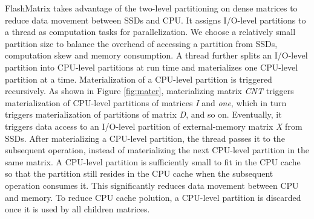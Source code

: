 FlashMatrix takes advantage of the two-level partitioning on dense matrices
to reduce data movement between SSDs and CPU. It assigns I/O-level partitions
to a thread as computation tasks for parallelization. We choose a relatively
small partition size to balance the overhead of accessing a partition from
SSDs, computation skew and memory consumption. A thread further splits
an I/O-level partition into CPU-level partitions at run time and materializes
one CPU-level partition at a time. Materialization of a CPU-level partition
is triggered recursively. As shown in Figure \ref{fig:mater}, materializing
matrix \textit{CNT} triggers materialization of CPU-level partitions of matrices
\textit{I} and \textit{one}, which in turn triggers materialization of
partitions of matrix \textit{D}, and so on. Eventually, it triggers data access
to an I/O-level partition of external-memory matrix \textit{X} from SSDs.
After materializing a CPU-level partition, the thread passes it to the subsequent
operation, instead of materializing the next CPU-level partition in the same matrix.
A CPU-level partition is sufficiently small to fit in the CPU cache so that
the partition still resides in the CPU cache when the subsequent operation consumes
it. This significantly reduces data movement between CPU and memory. To reduce
CPU cache polution, a CPU-level partition is discarded once it is used by all
children matrices.






